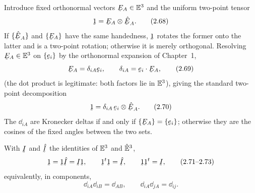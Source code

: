 \begin{definition}\label{def:shifter}
Introduce fixed orthonormal vectors $\bE_A\in\Vt$ and the uniform two-point
tensor
\begin{equation}
   \vek{1}=\bE_A\otimes\hbE_A . \tag{2.68}\label{eq:2.68}
\end{equation}
If $\{\hbE_A\}$ and $\{\bE_A\}$ have the same handedness, $\vek{1}$
rotates the former onto the latter and is a two-point rotation; otherwise it
is merely orthogonal. Resolving $\bE_A\in\Vt$ on $\{\be_i\}$ by the
orthonormal expansion of Chapter~1,
\begin{equation}
   \bE_A=\dd_{iA}\be_i,\qquad \dd_{iA}=\ip{\be_i}{\bE_A}, \tag{2.69}\label{eq:2.69}
\end{equation}
(the dot product is legitimate: both factors lie in $\mathbb{E}^{3}$), giving the
standard two-point decomposition
\begin{equation}
   \vek{1}=\dd_{iA}\,\be_i\otimes\hbE_A . \tag{2.70}\label{eq:2.70}
\end{equation}
The $\dd_{iA}$ are Kronecker deltas if and only if $\{\bE_A\}=\{\be_i\}$;
otherwise they are the cosines of the fixed angles between the two sets.
\end{definition}

\begin{proposition}\label{prop:shifter}
With $\I$ and $\hat\I$ the identities of $\mathbb{E}^{3}$ and $\hat{\mathbb{E}}^{3}$,
\begin{equation}
   \vek{1}=\vek{1}\hat\I=\I\vek{1},\qquad
   \vek{1}^{t}\vek{1}=\hat\I,\qquad
   \vek{1}\vek{1}^{t}=\I, \tag{2.71--2.73}\label{eq:2.71}
\end{equation}
equivalently, in components,
\begin{equation}
   \dd_{iA}\dd_{iB}=\dd_{AB},\qquad \dd_{iA}\dd_{jA}=\dd_{ij}. \tag{2.74}\label{eq:2.74}
\end{equation}
\end{proposition}

